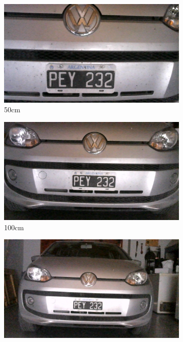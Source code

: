 \begin{figure}[bth]
    \centering
    \begin{subfigure}{.3\textwidth}
        \centering
        \includegraphics[width=\textwidth]{imgs/test-distancia/0_50.jpg}
        \caption{50cm}
    \end{subfigure}
    \begin{subfigure}{.3\textwidth}
        \centering
        \includegraphics[width=\textwidth]{imgs/test-distancia/0_100.jpg}
        \caption{100cm}
    \end{subfigure}
    \begin{subfigure}{.3\textwidth}
        \centering
        \includegraphics[width=\textwidth]{imgs/test-distancia/0_150.jpg}

\end{subfigure}
\end{figure}
